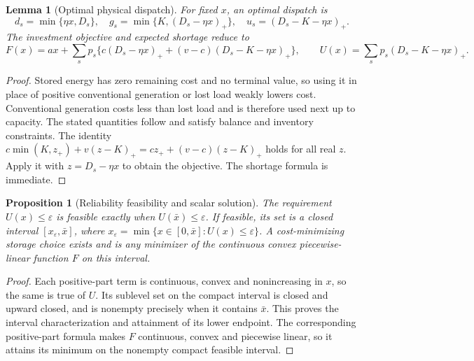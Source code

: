 \documentclass[11pt]{article}
\newtheorem{proposition}{Proposition}
\newtheorem{lemma}{Lemma}
\theoremstyle{definition}
\begin{document}
\begin{lemma}[Optimal physical dispatch]
For fixed $x$, an optimal dispatch is
\[
 d_s=\min\{\eta x,D_s\},\quad
 g_s=\min\{K,(D_s-\eta x)_+\},\quad
 u_s=(D_s-K-\eta x)_+.
\]
The investment objective and expected shortage reduce to
\[
 F(x)=ax+\sum_s p_s\{c(D_s-\eta x)_+
                   +(v-c)(D_s-K-\eta x)_+\},
 \qquad U(x)=\sum_s p_s(D_s-K-\eta x)_+.
\]
\end{lemma}
\begin{proof}
Stored energy has zero remaining cost and no terminal value, so using it in place of positive conventional generation or lost load weakly lowers cost. Conventional generation costs less than lost load and is therefore used next up to capacity. The stated quantities follow and satisfy balance and inventory constraints. The identity $c\min(K,z_+)+v(z-K)_+=c z_++(v-c)(z-K)_+$ holds for all real $z$. Apply it with $z=D_s-\eta x$ to obtain the objective. The shortage formula is immediate.
\end{proof}

\begin{proposition}[Reliability feasibility and scalar solution]
The requirement $U(x)\leq\varepsilon$ is feasible exactly when $U(\bar x)\leq\varepsilon$. If feasible, its set is a closed interval $[x_\varepsilon,\bar x]$, where $x_\varepsilon=\min\{x\in[0,\bar x]:U(x)\leq\varepsilon\}$. A cost-minimizing storage choice exists and is any minimizer of the continuous convex piecewise-linear function $F$ on this interval.
\end{proposition}
\begin{proof}
Each positive-part term is continuous, convex and nonincreasing in $x$, so the same is true of $U$. Its sublevel set on the compact interval is closed and upward closed, and is nonempty precisely when it contains $\bar x$. This proves the interval characterization and attainment of its lower endpoint. The corresponding positive-part formula makes $F$ continuous, convex and piecewise linear, so it attains its minimum on the nonempty compact feasible interval.
\end{proof}
\end{document}

